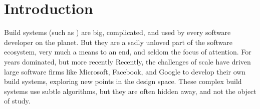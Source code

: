 \section{Introduction}\label{sec-intro}

Build systems (such as \Make) are big, complicated, and used by every
software developer on the planet.  But they are a sadly unloved part
of the software ecosystem, very much a means to an end, and seldom the
focus of attention.
For years \Make{} dominated, but more recently
Recently, the challenges of scale have driven large software firms
like Microsoft, Facebook, and Google to develop their own build
systems, exploring new points in the design space.
These complex build systems use subtle algorithms, but they
are often hidden away, and not the object of study.

